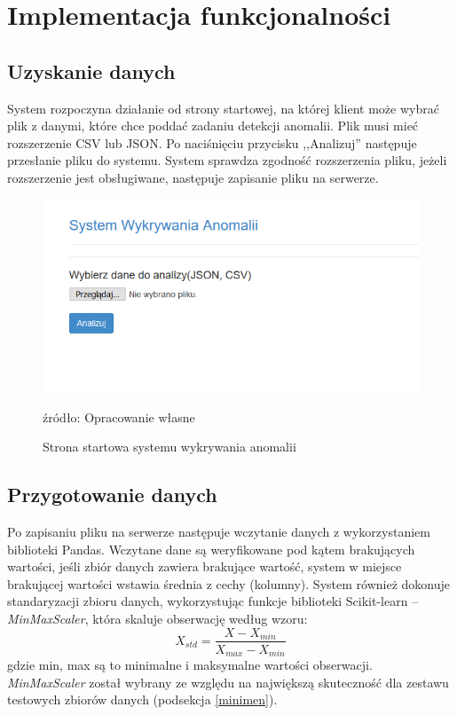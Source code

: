 \section{Implementacja funkcjonalności}

\subsection{Uzyskanie danych}
System rozpoczyna działanie od strony startowej, na której klient może wybrać plik z danymi, które chce poddać zadaniu detekcji anomalii. Plik musi mieć rozszerzenie CSV lub JSON. Po naciśnięciu przycisku ,,Analizuj'' następuje przesłanie pliku do systemu. System sprawdza zgodność rozszerzenia pliku, jeżeli rozszerzenie jest obsługiwane, następuje zapisanie pliku na serwerze.
\begin{figure}
    \centering
    \includegraphics[width=\textwidth]{chapters/projekt/images/index.png}
    \caption{Strona startowa systemu wykrywania anomalii}
    \footnotesize{źródło: Opracowanie własne}
    \label{fig:my_label}
\end{figure}
\subsection{Przygotowanie danych}
Po zapisaniu pliku na serwerze następuje wczytanie danych z wykorzystaniem biblioteki Pandas. Wczytane dane są weryfikowane pod kątem brakujących wartości, jeśli zbiór danych zawiera brakujące wartość, system w miejsce brakującej wartości wstawia średnia z cechy (kolumny). System również dokonuje standaryzacji zbioru danych, wykorzystując funkcje biblioteki Scikit-learn -- \textit{MinMaxScaler}, która skaluje obserwację według wzoru:
\begin{equation}
       X_{std} = \frac{X - X_{min}}{X_{max} - X_{min}} 
\end{equation}
 gdzie min, max są to minimalne i maksymalne wartości obserwacji. \textit{MinMaxScaler} został wybrany ze względu na największą skuteczność dla zestawu testowych zbiorów danych (podsekcja \ref{minimen}).
%  
 
